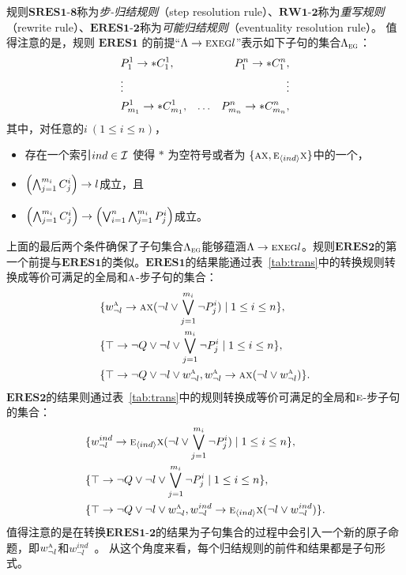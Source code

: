 规则$\textbf{SRES1-8}$称为\emph{步-归结规则}（step resolution rule）、$\textbf{RW1-2}$称为\emph{重写规则}（rewrite rule）、$\textbf{ERES1-2}$称为\emph{可能归结规则}（eventuality resolution rule）。
值得注意的是，规则 $\textbf{ERES1}$ 的前提“$\Lambda \rightarrow \textsc{e} \textsc{x} \textsc{e}\textsc{g} l$”表示如下子句的集合$\Lambda_{\textsc{e}\textsc{g}}$：
\begin{align*}
	& P_1^1\rightarrow *C_1^1, & & & P_1^n\rightarrow *C_1^n,\\
	& \vdots & && \vdots\\
	& P_{m_1}^1 \rightarrow * C_{m_1}^1, & \ldots && P_{m_n}^n\rightarrow *C_{m_n}^n,
\end{align*}
其中，对任意的$i~(1\le i\le n)$，
\begin{itemize}
	\item 存在一个索引$ind \in {\cal I}$ 使得 $*$ 为空符号或者为 $\{\textsc{a}\textsc{x}, \textsc{e}_{{\langle{ind}\rangle}}\textsc{x}\}$中的一个，
	\item $\left(\bigwedge_{j=1}^{m_i} C_j^i\right) \rightarrow l$成立，且
	\item $\left(\bigwedge_{j=1}^{m_i} C_j^i\right) \rightarrow \left(\bigvee_{i=1}^n\bigwedge_{j=1}^{m_i} P_j^i\right)$成立。
\end{itemize}

上面的最后两个条件确保了子句集合$\Lambda_{\textsc{e}\textsc{g}}$能够蕴涵$\Lambda \rightarrow \textsc{e} \textsc{x} \textsc{e}\textsc{g} l$。规则$\textbf{ERES2}$的第一个前提与$\textbf{ERES1}$的类似。$\textbf{ERES1}$的结果能通过表~\ref{tab:trans}中的转换规则转换成等价可满足的全局和$\textsc{a}$-步子句的集合：
\begin{align*}
	& \{w_{\neg l}^{\textsc{a}} \rightarrow \textsc{a}\textsc{x}(\neg l \vee \bigvee_{j=1}^{m_i} \neg P_j^i) \mid 1 \leq i \leq n\},\\
	& \{\top \rightarrow \neg Q \vee \neg l \vee \bigvee_{j=1}^{m_i} \neg P_j^i \mid 1 \leq i \leq n\},\\
	& \{\top \rightarrow \neg Q \vee \neg l \vee w_{\neg l}^{\textsc{a}}, w_{\neg l}^{\textsc{a}} \rightarrow \textsc{a}\textsc{x}(\neg l \vee w_{\neg l}^{\textsc{a}})\}.
\end{align*}
$\textbf{ERES2}$的结果则通过表~\ref{tab:trans}中的规则转换成等价可满足的全局和$\textsc{e}$-步子句的集合：
\begin{align*}
	& \{w_{\neg l}^{ind} \rightarrow \textsc{e}_{{\langle{ind}\rangle}}\textsc{x}(\neg l \vee \bigvee_{j=1}^{m_i} \neg P_j^i) \mid 1 \leq i \leq n\},\\
	& \{\top \rightarrow \neg Q \vee \neg l \vee \bigvee_{j=1}^{m_i} \neg P_j^i \mid 1 \leq i \leq n\},\\
	& \{\top \rightarrow \neg Q \vee \neg l \vee w_{\neg l}^{\textsc{a}}, w_{\neg l}^{ind} \rightarrow \textsc{e}_{{\langle{ind}\rangle}}\textsc{x}(\neg l \vee w_{\neg l}^{ind})\}.
\end{align*}
值得注意的是在转换$\textbf{ERES1-2}$的结果为子句集合的过程中会引入一个新的原子命题，即$w_{\neg l}^{\textsc{a}}$和$w_{\neg l}^{ind}$~\cite{zhang2014resolution}。
从这个角度来看，每个归结规则的前件和结果都是子句形式。

